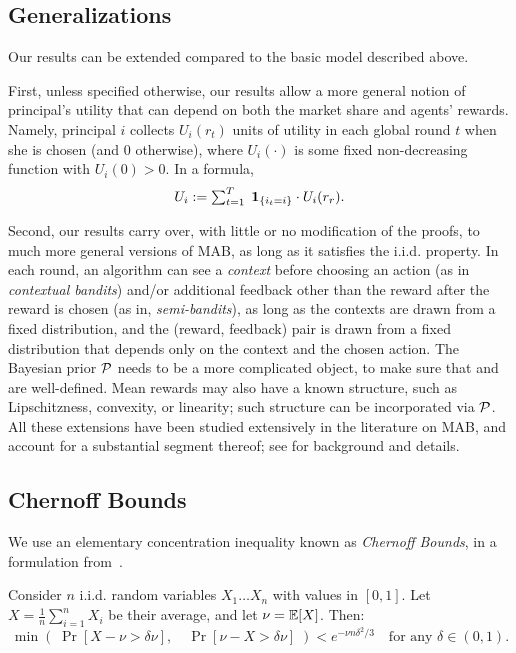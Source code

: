 \subsection{Generalizations}
\label{sec:model-extensions}

Our results can be extended compared to the basic model described above.


First, unless specified otherwise, our results allow a more general notion of principal's utility that can depend on both the market share and agents' rewards. Namely, principal $i$ collects $U_i(r_t)$ units of utility in each global round $t$ when she is chosen (and $0$ otherwise), where $U_i(\cdot)$ is some fixed non-decreasing function with $U_i(0)>0$. In a formula,
\begin{align}\label{eq:general-utility}
\textstyle U_i := \sum_{t=1}^T\; {\bf 1}_{\{i_t=i\}}\cdot U_i(r_r).
\end{align}

Second, our results carry over, with little or no modification of the proofs, to much more general versions of MAB, as long as it satisfies the i.i.d. property. In each round, an algorithm can see a \emph{context} before choosing an action (as in \emph{contextual bandits}) and/or additional feedback other than the reward after the reward is chosen (as in, \eg \emph{semi-bandits}), as long as the contexts are drawn from a fixed distribution, and the (reward, feedback) pair is drawn from a fixed distribution that depends only on the context and the chosen action. The Bayesian prior $\mathcal{P}$ needs to be a more complicated object, to make sure that \PMR and \BIR are well-defined. Mean rewards may also have a known structure, such as Lipschitzness, convexity, or linearity; such structure can be incorporated via $\mathcal{P}$. All these extensions have been studied extensively in the literature on MAB, and account for a substantial segment thereof; see \cite{Bubeck-survey12} for background and details.

\subsection{Chernoff Bounds}

We use an elementary concentration inequality known as {\em Chernoff Bounds}, in a formulation from~\cite{MitzUpfal-book05}.
\begin{theorem}
\label{thm:chernoff}
Consider $n$ i.i.d. random variables $X_1 \ldots X_n$ with values in $[0,1]$. Let
    $X = \tfrac{1}{n} \sum_{i=1}^n X_i$ be their average, and let $\nu = \E[X]$. Then:
\[ \min\left(\; \Pr[ X-\nu > \delta \nu ],\quad
                \Pr[ \nu-X > \delta \nu ]
    \; \right)
    < e^{-\nu n \delta^2/3}
    \quad \text{for any $\delta\in (0,1)$.}
\]
\end{theorem}




